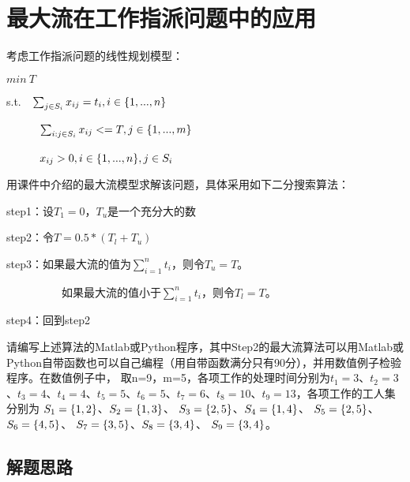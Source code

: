 \documentclass{ds201}
\begin{document}

\makecover




\section{最大流在工作指派问题中的应用}

考虑工作指派问题的线性规划模型：

$min\ T$

s.t.\ \ $\sum_{j \in S_i} x_{ij} =t_i,  i\in\text{\textbraceleft}1,...,n\text{\textbraceright}$

\ \ \ \ \ \ $\sum_{i:j \in S_i} x_{ij}<=T,  j\in\text{\textbraceleft}1,...,m\text{\textbraceright}$

\ \ \ \ \ \ $x_{ij}>0, i\in\text{\textbraceleft}1,...,n\text{\textbraceright},j\in S_i$

用课件中介绍的最大流模型求解该问题，具体采用如下二分搜索算法：

step1：设$T_1=0$，$T_u$是一个充分大的数

step2：令$T=0.5*(T_l+T_u)$

step3：如果最大流的值为$\sum_{i=1}^n t_i$，则令$T_u=T$。

\ \ \ \ \ \ \ \ \ \ 如果最大流的值小于$\sum_{i=1}^n t_i$，则令$T_l=T$。

step4：回到step2

请编写上述算法的Matlab或Python程序，其中Step2的最大流算法可以用Matlab或Python自带函数也可以自己编程（用自带函数满分只有90分），并用数值例子检验程序。在数值例子中，
取n=9，m=5，各项工作的处理时间分别为$t_1=3$、$t_2=3$、$t_3=4$、$t_4=4$、$t_5=5$、$t_6=5$、$t_7=6$、$t_8=10$、$t_9=13$，各项工作的工人集分别为
$S_1=\text{\textbraceleft}1,2\text{\textbraceright}$、$S_2=\text{\textbraceleft}1,3\text{\textbraceright}$、
$S_3=\text{\textbraceleft}2,5\text{\textbraceright}$、$S_4=\text{\textbraceleft}1,4\text{\textbraceright}$、
$S_5=\text{\textbraceleft}2,5\text{\textbraceright}$、$S_6=\text{\textbraceleft}4,5\text{\textbraceright}$、
$S_7=\text{\textbraceleft}3,5\text{\textbraceright}$、$S_8=\text{\textbraceleft}3,4\text{\textbraceright}$、
$S_9=\text{\textbraceleft}3,4\text{\textbraceright}$。
\subsection{解题思路}
\end{document}
